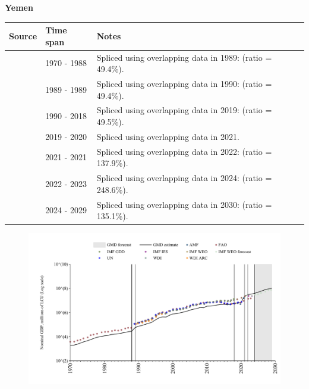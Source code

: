 \documentclass[12pt,a4paper,landscape]{article}
\begin{document}
\begin{adjustbox}{max totalsize={\paperwidth}{\paperheight},center}
\begin{minipage}[t][\textheight][t]{\textwidth}
\vspace*{0.5cm}
{}
\begin{center}
{\Large\bfseries Yemen}
\end{center}
\vspace{0.5cm}
\begin{table}[H]
\centering
\small
\begin{tabular}{|l|l|l|}
\hline
\textbf{Source} & \textbf{Time span} & \textbf{Notes} \\
\hline
\rowcolor{white}\cite{FAO}& 1970 - 1988 &Spliced using overlapping data in 1989: (ratio = 49.4\%).\\
\rowcolor{lightgray}\cite{UN}& 1989 - 1989 &Spliced using overlapping data in 1990: (ratio = 49.4\%).\\
\rowcolor{white}\cite{WDI}& 1990 - 2018 &Spliced using overlapping data in 2019: (ratio = 49.5\%).\\
\rowcolor{lightgray}\cite{UN}& 2019 - 2020 &Spliced using overlapping data in 2021.\\
\rowcolor{white}\cite{AMF}& 2021 - 2021 &Spliced using overlapping data in 2022: (ratio = 137.9\%).\\
\rowcolor{lightgray}\cite{FAO}& 2022 - 2023 &Spliced using overlapping data in 2024: (ratio = 248.6\%).\\
\rowcolor{white}\cite{IMF_WEO_forecast}& 2024 - 2029 &Spliced using overlapping data in 2030: (ratio = 135.1\%).\\
\hline
\end{tabular}
\end{table}
\begin{figure}[H]
\centering
\includegraphics[width=\textwidth,height=0.6\textheight,keepaspectratio]{graphs/YEM_nGDP.pdf}
\end{figure}
\end{minipage}
\end{adjustbox}
\end{document}
